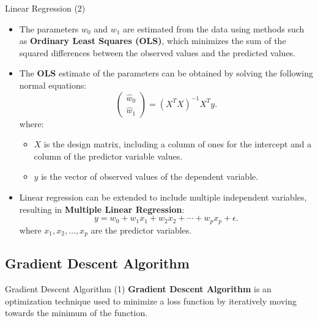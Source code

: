 \documentclass[10pt, hyperref={colorlinks = true,linkcolor = blue}]{beamer}
\begin{document}
{{\begin{frame}{Linear Regression (2) }
 \begin{itemize}[<+->]
  \item The parameters \(w_0\) and \(w_1\) are estimated from the data using methods such as \textbf{Ordinary Least Squares (OLS)}, which minimizes the sum of the squared differences between the observed values and the predicted values.
    \item The \textbf{OLS} estimate of the parameters can be obtained by solving the following normal equations:
    \[
    \begin{pmatrix}
    \hat{w}_0 \\
    \hat{w}_1
    \end{pmatrix}
    =
    \left( X^T X \right)^{-1} X^T y.
    \]
    where:
    \begin{itemize}
        \item \(X\) is the design matrix, including a column of ones for the intercept and a column of the predictor variable values.
        \item \(y\) is the vector of observed values of the dependent variable.
    \end{itemize}
    \item Linear regression can be extended to include multiple independent variables, resulting in \textbf{Multiple Linear Regression}:
    \[
    y = w_0 + w_1 x_1 + w_2 x_2 + \cdots + w_p x_p + \epsilon.
    \]
    where \(x_1, x_2, \ldots, x_p\) are the predictor variables.
\end{itemize}
\end{frame}

}

{\subsection{Gradient Descent Algorithm}

\begin{frame}{Gradient Descent Algorithm (1)}
\textbf{Gradient Descent Algorithm} is an optimization technique used to minimize a loss function by iteratively moving towards the minimum of the function.



\end{frame}}}
\end{document}
